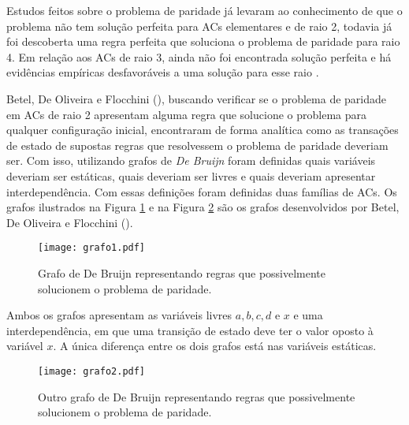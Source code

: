Estudos feitos sobre o problema de paridade já levaram ao conhecimento de que o problema não tem solução perfeita para ACs elementares e de raio 2, todavia já foi descoberta uma regra perfeita que soluciona o problema de paridade para raio 4. Em relação aos ACs de raio 3, ainda não foi encontrada solução perfeita e há evidências empíricas desfavoráveis a uma solução para esse raio \cite{Betel2013}.

Betel, De Oliveira e Flocchini (\citeyear{Betel2013}), buscando verificar se o problema de paridade em ACs de raio 2 apresentam alguma regra que solucione o problema para qualquer configuração inicial, encontraram de forma analítica como as transações de estado de supostas regras que resolvessem o problema de paridade deveriam ser. Com isso, utilizando grafos de \textit{De Bruijn} %
foram definidas quais variáveis deveriam ser estáticas, quais deveriam ser livres e quais deveriam apresentar interdependência. Com essas definições foram definidas duas famílias de ACs. Os grafos ilustrados na Figura \ref{fig:grafosDeBruijn} e na Figura \ref{fig:grafosDeBruijn2} são os grafos desenvolvidos por Betel, De Oliveira e Flocchini (\citeyear{Betel2013}).

\begin{figure}[h!]
\centering
\texttt{[image: grafo1.pdf]}
\caption{Grafo de De Bruijn representando regras que possivelmente solucionem o problema de paridade. \cite{Betel2013}}
\label{fig:grafosDeBruijn}
\end{figure}

Ambos os grafos apresentam as variáveis livres $a, b, c, d \text{ e } x$ e uma interdependência, em que uma transição de estado deve ter o valor oposto à variável $x$. A única diferença entre os dois grafos está nas variáveis estáticas.

\begin{figure}[h!]
\centering
\texttt{[image: grafo2.pdf]}
\caption{Outro grafo de De Bruijn representando regras que possivelmente solucionem o problema de paridade.\cite{Betel2013}}
\label{fig:grafosDeBruijn2}
\end{figure}


